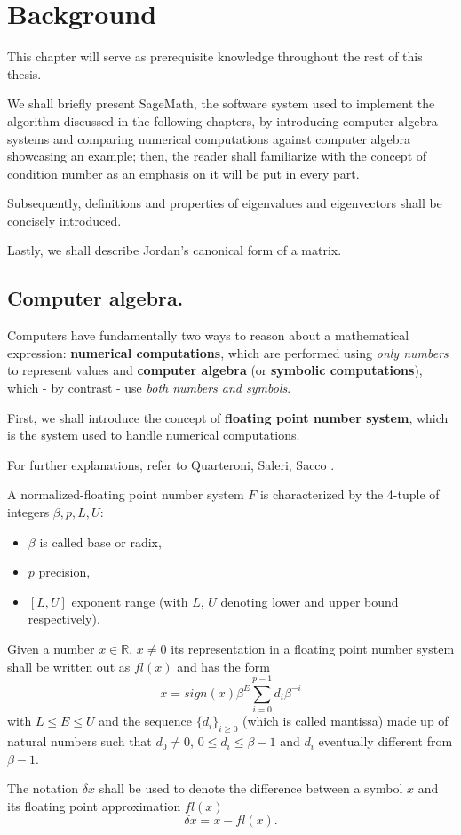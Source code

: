 \section{Background}
This chapter will serve as prerequisite knowledge throughout the rest of this thesis.

We shall briefly present SageMath, the software system used to implement the algorithm discussed in the following chapters,
by introducing computer algebra systems and comparing numerical computations against computer algebra showcasing an
example; then, the reader shall familiarize with the concept of condition number as an emphasis on it will be put in
every part.

Subsequently, definitions and properties of eigenvalues and eigenvectors shall be concisely introduced.

Lastly, we shall describe Jordan's canonical form of a matrix.

\subsection*{Computer algebra.}
Computers have fundamentally two ways to reason about a mathematical expression: \textbf{numerical computations}, which are
performed using \textit{only numbers} to represent values and \textbf{computer algebra} (or \textbf{symbolic computations}),
which - by contrast - use \textit{both numbers and symbols}.

First, we shall introduce the concept of \textbf{floating point number system}, which is the system used to handle numerical
computations.

For further explanations, refer to Quarteroni, Saleri, Sacco \cite{numerical-mathematics}.
\begin{definition} \cite[2.5.2]{numerical-mathematics}
    A normalized-floating point number system \(F\) is characterized by the 4-tuple of integers \(\beta, p, L, U\):
    \begin{itemize}[topsep=0pt, itemsep=0pt, parsep=0pt]
        \item \(\beta\) is called base or radix,
        \item \(p\) precision,
        \item \([L, U]\) exponent range (with \(L\), \(U\) denoting lower and upper bound respectively).
    \end{itemize}
    Given a number \(x \in \mathbb{R}\), \(x \neq 0\) its representation in a floating point number system shall be written
    out as \(fl(x)\) and has the form
    \[x = sign(x) \beta^E \sum_{i=0}^{p-1}d_{i}\beta^{-i}\]
    with \(L \leq E \leq U\) and the sequence \(\{d_{i}\}_{i \geq 0}\) (which is called mantissa) made up of
    natural numbers such that \(d_{0} \neq 0\), \(0 \leq d_{i} \leq \beta - 1\) and \(d_{i}\)
    eventually different from \(\beta - 1\).

    The notation \(\delta x\) shall be used to denote the difference between a symbol \(x\) and its floating point
    approximation \(fl(x)\)
    \[
        \delta x = x - fl(x).
    \]
\end{definition}

